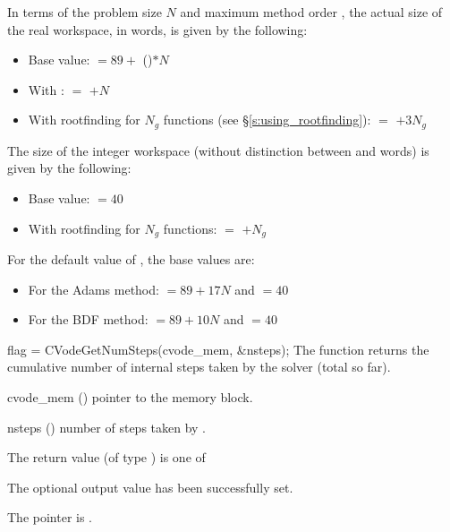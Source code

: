 {
  In terms of the problem size $N$ and maximum method order ,
  the actual size of the real workspace, in  words, is
  given by the following:
  \begin{itemize}
  \item Base value:  $= 89 +$ ()$* N$
  \item With :  $=$  $+ N$ 
  \item With rootfinding for $N_g$ functions (see \S\ref{s:using_rootfinding}): 
     $=$ $+ 3N_g$ 
  \end{itemize}

  The size of the integer workspace (without distinction between  
  and  words) is given by the following:
  \begin{itemize}
  \item Base value:  $=40$
  \item With rootfinding for $N_g$ functions:  $=$ $+ N_g$ 
  \end{itemize}

  For the default value of , the base values are:
  \begin{itemize}
  \item For the Adams method:  $=89 + 17N$ and  $=40$ 
  \item For the BDF method:  $=89 + 10N$ and  $=40$ 
  \end{itemize}
}
{
  flag = CVodeGetNumSteps(cvode\_mem, \&nsteps);
}
{
  The function  returns the cumulative number of internal 
  steps taken by the solver (total so far).
}
{
  \begin{args}
  \item[cvode\_mem] ()
    pointer to the {\cvode} memory block.
  \item[nsteps] ()
    number of steps taken by {\cvode}.
  \end{args}
}
{
  The return value  (of type ) is one of
  \begin{args}
  \item[\Id{CV\_SUCCESS}] 
    The optional output value has been successfully set.
  \item[\Id{CV\_MEM\_NULL}]
    The  pointer is .
  \end{args}
}
